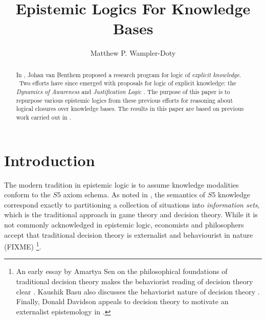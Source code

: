 \documentclass{article}
\newcommand{\tmtextit}[1]{{\itshape{#1}}}
\begin{document}
\title{Epistemic Logics For Knowledge Bases}\author{Matthew P.
Wampler-Doty}\maketitle

\begin{abstract}
  In {\cite{van_benthem_reflectionsepistemic_1991}}, Johan van Benthem
  proposed a research program for logic of \tmtextit{explicit knowledge}. \
  Two efforts have since emerged with proposals for logic of explicit
  knowledge: the \tmtextit{Dynamics of Awareness}
  {\cite{van_benthem_inference_2009}} and \tmtextit{Justification Logic}
  {\cite{artemov_introducing_2005}}.  The purpose of this paper is to
  repurpose various epistemic logics from these previous efforts for reasoning
  about logical closures over knowledge bases.  The results in this paper are
  based on previous work carried out in
  {\cite{wampler-doty_evidentialist_2010}}.
\end{abstract}

\section{Introduction\label{intro}}

The modern tradition in epistemic logic is to assume knowledge modalities
conform to the $S 5$ axiom schema.  As noted in
{\cite{halpern_set-theoretic_1999,rubinstein_modeling_1998}}, the semantics of
$S 5$ knowledge correspond exactly to partitioning a collection of situations
into \tmtextit{information sets}, which is the traditional approach in game
theory and decision theory.  While it is not commonly acknowledged in
epistemic logic, economists and philosophers accept that traditional decision
theory is externalist and behaviourist in nature
(FIXME)
\footnote{An early essay by
Amartya Sen on the philosophical foundations of traditional decision theory
makes the behaviorist reading of decision theory clear
\cite{sen_behaviour_1973}.  Kaushik Basu also discusses the behaviorist
nature of decision theory {\cite[pgs. 53--54]{basu_revealed_1980}}. 
Finally, Donald Davidson appeals to decision theory to motivate an externalist
epistemology in \cite{davidson_could_1995}.}.
\end{document}
